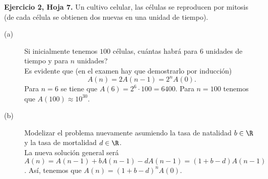 \begin{eg}
\normalfont \textbf{Ejercicio 2, Hoja 7.} Un cultivo celular, las células se reproducen por mitosis (de cada célula se obtienen dos nuevas en una unidad de tiempo). 
\begin{description}
\item[(a)] Si inicialmente tenemos $\displaystyle 100 $ células, cuántas habrá para $\displaystyle 6 $ unidades de tiempo y para $\displaystyle n $ unidades? \\
Es evidente que (en el examen hay que demostrarlo por inducción)
\[A\left(n\right) = 2A\left(n-1\right) = 2^{n}A\left(0\right).\]
Para $\displaystyle n = 6 $ se tiene que $\displaystyle A\left(6\right) = 2^{6} \cdot 100 = 6400 $. Para $\displaystyle n = 100 $ tenemos que $\displaystyle A\left(100\right) \approx 10^{30} $. 
\item[(b)] Modelizar el problema nuevamente asumiendo la tasa de natalidad $\displaystyle b \in \R $ y la tasa de mortalidad $\displaystyle d \in \R $. \\
	La nueva solución general será $\displaystyle A\left(n\right) = A\left(n-1\right) + bA\left(n-1\right) - dA\left(n-1\right) = \left(1+b-d\right)A\left(n-1\right) $. Así, tenemos que $\displaystyle A\left(n\right) = \left(1+b-d\right)^{n}A\left(0\right) $.
\end{description}
\end{eg}
